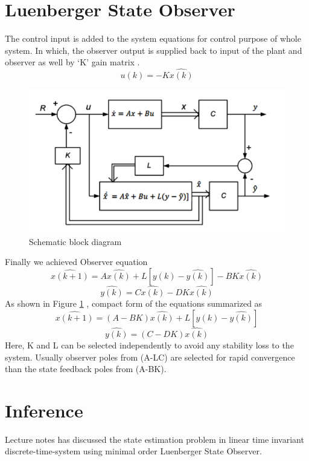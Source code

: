 \documentclass[12pt,a4paper]{article}
\begin{document}
\section*{Luenberger State Observer}
The control input is added to the system equations for control purpose of whole system. In which, the observer output is supplied back to input of the plant and observer as well by ‘K’ gain matrix \cite{pasand2019luenberger} \cite{hadj2001estimation}.
\begin{equation}
u(k)= -K\hat{x(k)}
\end{equation}
\begin{figure}[h]
  \centering
  \includegraphics[width=4.5 in]{s.PNG}
  \caption{Schematic block diagram}\label{1}
\end{figure}
Finally we achieved Observer equation\\
\begin{equation}
\hat{x(k+1)} = A\hat{x(k)} + L[y(k)-\hat{y(k)}]- BK\hat{x(k)}
\end{equation}
\begin{equation}
\hat{y(k)} = C\hat{x(k)} - DK\hat{x(k)}
\end{equation}
As shown in Figure \ref{1} \cite{vinodh2013comparison}, compact form of the equations summarized as
\begin{equation}
\hat{x(k+1)} = (A- BK)\hat{x(k)} + L[y(k)-\hat{y(k)}]
\end{equation}
\begin{equation}
\hat{y(k)} = (C- DK)\hat{x(k)}
\end{equation}
Here, K and L can be selected independently to avoid any stability loss to the system.  Usually observer poles from (A-LC) are selected for rapid convergence than the state feedback poles from (A-BK).

\section*{Inference}
Lecture notes has discussed the state estimation problem in linear time invariant discrete-time-system using minimal order Luenberger State Observer. 


\end{document}

